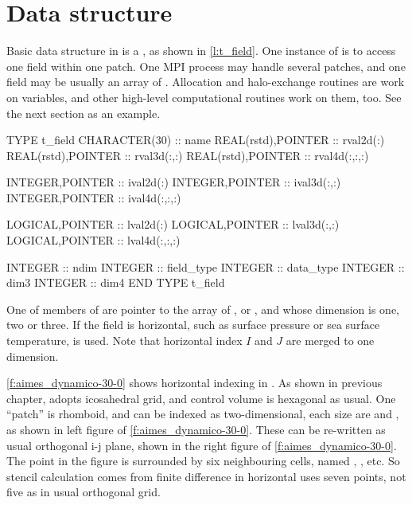 \section{Data structure}\label{s:data_structure}

Basic data structure in \DYNAMICO is a , as shown in
\autoref{l:t_field}.
%
One instance of  is to access one field within one patch.
%
One MPI process may handle several patches, and one field may be usually
an array of .
%
Allocation and halo-exchange routines are work on 
variables, and other high-level computational routines work on them, too.
%
See the next section as an example.

\begin{LstF90}[%
caption={\src{t_field} structure},%
label={l:t_field}%
]
  TYPE t_field
    CHARACTER(30)      :: name
    REAL(rstd),POINTER :: rval2d(:)
    REAL(rstd),POINTER :: rval3d(:,:)
    REAL(rstd),POINTER :: rval4d(:,:,:)

    INTEGER,POINTER :: ival2d(:)
    INTEGER,POINTER :: ival3d(:,:)
    INTEGER,POINTER :: ival4d(:,:,:)

    LOGICAL,POINTER :: lval2d(:)
    LOGICAL,POINTER :: lval3d(:,:)
    LOGICAL,POINTER :: lval4d(:,:,:)

    INTEGER :: ndim
    INTEGER :: field_type
    INTEGER :: data_type
    INTEGER :: dim3
    INTEGER :: dim4
  END TYPE t_field
\end{LstF90}

One of members of  are pointer to the array of
,  or , and whose dimension is
one, two or three.
%
If the field is horizontal, such as surface pressure or sea surface
temperature,  is used.
%
Note that horizontal index $I$ and $J$ are merged to one dimension.


\autoref{f:aimes_dynamico-30-0} shows horizontal indexing in \DYNAMICO.
%
As shown in previous chapter, \DYNAMICO adopts icosahedral grid, and
control volume is hexagonal as usual.
%
One ``patch'' is rhomboid, and can be indexed as two-dimensional, each
size are  and , as shown in left figure of
\autoref{f:aimes_dynamico-30-0}.
%
These can be re-written as usual orthogonal i-j plane, shown in the
right figure of \autoref{f:aimes_dynamico-30-0}.
%
The  point in the figure is surrounded by
six neighbouring cells, named , , etc.
%
So stencil calculation comes from finite difference in horizontal uses
seven points, not five as in usual orthogonal grid.


